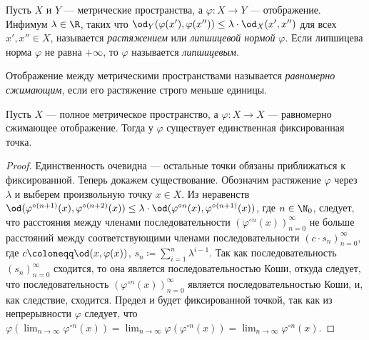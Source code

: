\documentclass[
	extrafontsizes,
	11pt,
	hyphens,
]{memoir}
\begin{document}
\begin{definition}
Пусть \(X\) и \(Y\) --- метрические пространства,
а \(\varphi: X \to Y\) --- отображение.
Инфимум \(\lambda \in \R\), таких что
\(\od_Y(\varphi(x'), \varphi(x'')) \leq \lambda \cdot \od_X(x', x'')\)
для всех \(x',x'' \in X\),
называется \emph{растяжением} или \emph{липшицевой нормой} \(\varphi\).
Если липшицева норма \(\varphi\) не равна \(+\infty\), то \(\varphi\) называется \emph{липшицевым}.
\end{definition}

\begin{definition}
Отображение между метрическими пространствами называется \emph{равномерно сжимающим}, если его растяжение строго меньше единицы.
\end{definition}

\begin{theorem}
Пусть \(X\) --- полное метрическое пространство, а
\(\varphi: X \to X\) --- равномерно сжимающее отображение. Тогда у \(\varphi\) существует единственная фиксированная точка.
\end{theorem}

\begin{proof}
Единственность очевидна --- остальные точки обязаны приближаться к фиксированной.
Теперь докажем существование.
Обозначим растяжение \(\varphi\) через \(\lambda\) и выберем произвольную точку \(x \in X\).
Из неравенств
\(
\od(\varphi^{\circ (n+1)}(x), \varphi^{\circ (n+2)}(x))
\leq
\lambda \cdot
\od(\varphi^{\circ n}(x), \varphi^{\circ (n+1)}(x)) 
\),
где \(n \in \N_0\),
следует, что расстояния между членами последовательности \((\varphi^{\circ n}(x))_{n = 0}^\infty\) не больше расстояний между соответствующими членами последовательности
\((c \cdot s_n)_{n=0}^\infty\),
где
\(c \coloneqq \od(x, \varphi(x))\),
\(s_n \coloneqq \sum_{i = 1}^n \lambda^{i-1}\).
Так как последовательность
\((s_n)_{n=0}^\infty\)
сходится, то она является последовательностью Коши, откуда следует, что последовательность \((\varphi^{\circ n}(x))_{n = 0}^\infty\) является последовательностью Коши, и, как следствие, сходится.
Предел и будет фиксированной точкой, так как из непрерывности \(\varphi\) следует, что
\(\varphi(\lim_{n \to \infty} \varphi^{\circ n}(x)) = \lim_{n \to \infty} \varphi(\varphi^{\circ n}(x)) = \lim_{n \to \infty} \varphi^{\circ n}(x)\).
\end{proof}
\end{document}

